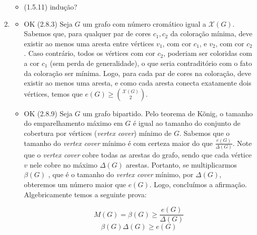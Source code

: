 \documentclass{article}
\begin{document}
\begin{enumerate}
\begin{itemize}
		      \item (1.5.11) indução?
	      \end{itemize}
	\item \begin{itemize}
		      \item OK (2.8.3) Seja \(G\) um grafo com número cromático igual a \(\mathcal{X}(G)\). Sabemos que, para qualquer par de cores \(c_1, c_2\) da coloração mínima, deve existir ao menos uma aresta entre vértices \(v_1\), com cor \(c_1\), e \(v_2\), com cor \(c_2\). Caso contrário, todos os vértices com cor \(c_2\), poderiam ser coloridas com a cor \(c_1\) (sem perda de generalidade), o que seria contraditório com o fato da coloração ser mínima. Logo, para cada par de cores na coloração, deve existir ao menos uma aresta, e como cada aresta conecta exatamente dois vértices, temos que \(e(G) \ge \binom{\mathcal{X}(G)}{2}\).
		      \item OK (2.8.9) Seja \(G\) um grafo bipartido. Pelo teorema de Kõnig, o tamanho do emparelhamento máximo em \(G\) é
		            igual ao tamanho do conjunto de cobertura por vértices (\textit{vertex cover}) mínimo de \(G\). Sabemos que o
		            tamanho do \textit{vertex cover} mínimo é com certeza maior do que \(\frac{e(G)}{\Delta(G)}\). Note que o \textit{vertex cover} cobre todas as
		            arestas do grafo, sendo que cada vértice \(v\) nele cobre no máximo \(\Delta(G)\) arestas. Portanto, se multiplicarmos \(\beta(G)\) , que é
		            o tamanho do \textit{vertex cover} mínimo, por \(\Delta(G)\), obteremos um número maior que \(e(G)\). Logo, concluímos a afirmação.
		            Algebricamente temos a seguinte prova:

		            \[M(G) = \beta(G) \geq \frac{e(G)}{\Delta(G)}\]
		            \[\beta(G)\Delta(G) \geq e(G)\]



\end{itemize}
\end{enumerate}
\end{document}
